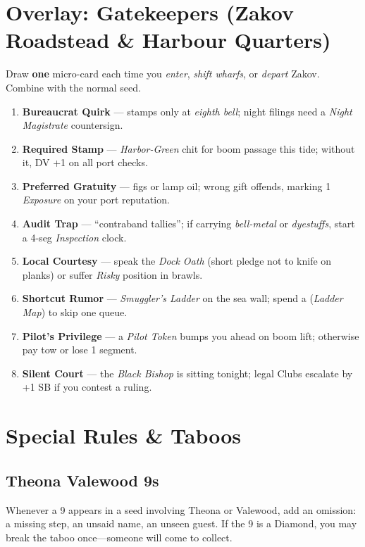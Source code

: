 \documentclass[11pt,letterpaper,twoside]{book}
\begin{document}
\section{Overlay: Gatekeepers (Zakov Roadstead \& Harbour Quarters)}
Draw \textbf{one} micro-card each time you \emph{enter}, \emph{shift wharfs}, or \emph{depart} Zakov. Combine with the normal seed.

\begin{tcolorbox}[enhanced,breakable,sharp corners,boxrule=.6pt,title={Zakov Gatekeepers Micro-Cards (draw 1)}]
\begin{enumerate}[label=\arabic*.]
  \item \textbf{Bureaucrat Quirk} — stamps only at \emph{eighth bell}; night filings need a \emph{Night Magistrate} countersign.
  \item \textbf{Required Stamp} — \emph{Harbor-Green} chit for boom passage this tide; without it, DV +1 on all port checks.
  \item \textbf{Preferred Gratuity} — figs or lamp oil; wrong gift offends, marking 1 \emph{Exposure} on your port reputation.
  \item \textbf{Audit Trap} — ``contraband tallies''; if carrying \emph{bell-metal} or \emph{dyestuffs}, start a 4-seg \emph{Inspection} clock.
  \item \textbf{Local Courtesy} — speak the \emph{Dock Oath} (short pledge not to knife on planks) or suffer \emph{Risky} position in brawls.
  \item \textbf{Shortcut Rumor} — \emph{Smuggler's Ladder} on the sea wall; spend a \SuitDiamond{} (\emph{Ladder Map}) to skip one queue.
  \item \textbf{Pilot's Privilege} — a \emph{Pilot Token} bumps you ahead on boom lift; otherwise pay tow or lose 1 segment.
  \item \textbf{Silent Court} — the \emph{Black Bishop} is sitting tonight; legal Clubs escalate by +1 SB if you contest a ruling.
\end{enumerate}
\end{tcolorbox}

\section{Special Rules \& Taboos}

\subsection{Theona Valewood 9s}
Whenever a 9 appears in a seed involving Theona or Valewood, add an omission: a missing step, an unsaid name, an unseen guest. If the 9 is a Diamond, you may break the taboo once---someone will come to collect.
\end{document}
